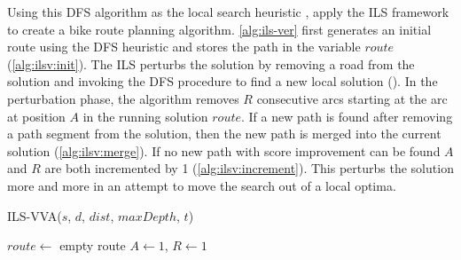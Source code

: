 \documentclass[honors]{union-cs-thesis}
\begin{document}
Using this DFS algorithm as the local search heuristic \citeauthor{verbeeck2014extension}, apply the ILS framework to create a bike route planning algorithm. \cref{alg:ils-ver} first generates an initial route using the DFS heuristic and stores the path in the variable $route$ (\cref{alg:ilsv:init}). The ILS perturbs the solution by removing a road from the solution and invoking the DFS procedure to find a new local solution (). In the perturbation phase, the algorithm removes $R$ consecutive arcs starting at the arc at position $A$ in the running solution $route$. If a new path is found after removing a path segment from the solution, then the new path is merged into the current solution (\cref{alg:ilsv:merge}). If no new path with score improvement can be found $A$ and $R$ are both incremented by 1 (\cref{alg:ilsv:increment}). This perturbs the solution more and more in an attempt to move the search out of a local optima.

%
%
\begin{algorithm}
    \caption{ILS-VVA($s$, $d$, $dist$, $maxDepth$, $t$) \label{alg:ils-ver}}
    
    $route \gets$ empty route\;
    $A \gets 1$, $R \gets 1$\;
    
    
\end{algorithm}
\end{document}
